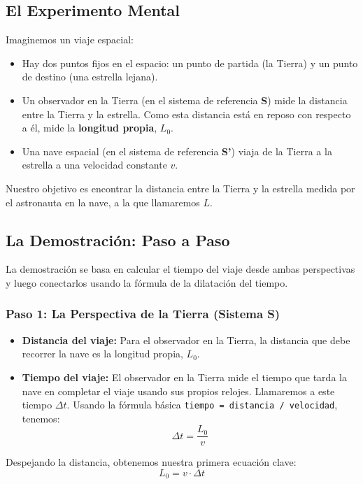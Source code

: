 \documentclass[11pt,a4paper]{book}
\begin{document}
\subsection*{El Experimento Mental}
Imaginemos un viaje espacial:
\begin{itemize}
    \item Hay dos puntos fijos en el espacio: un punto de partida (la Tierra) y un punto de destino (una estrella lejana).
    \item Un observador en la Tierra (en el sistema de referencia \textbf{S}) mide la distancia entre la Tierra y la estrella. Como esta distancia está en reposo con respecto a él, mide la \textbf{longitud propia}, $L_0$.
    \item Una nave espacial (en el sistema de referencia \textbf{S'}) viaja de la Tierra a la estrella a una velocidad constante $v$.
\end{itemize}
Nuestro objetivo es encontrar la distancia entre la Tierra y la estrella medida por el astronauta en la nave, a la que llamaremos $L$.

\subsection*{La Demostración: Paso a Paso}
La demostración se basa en calcular el tiempo del viaje desde ambas perspectivas y luego conectarlos usando la fórmula de la dilatación del tiempo.

\subsubsection*{Paso 1: La Perspectiva de la Tierra (Sistema S)}
\begin{itemize}
    \item \textbf{Distancia del viaje:} Para el observador en la Tierra, la distancia que debe recorrer la nave es la longitud propia, $L_0$.
    \item \textbf{Tiempo del viaje:} El observador en la Tierra mide el tiempo que tarda la nave en completar el viaje usando sus propios relojes. Llamaremos a este tiempo $\Delta t$. Usando la fórmula básica \texttt{tiempo = distancia / velocidad}, tenemos:
    \[ \Delta t = \frac{L_0}{v} \]
\end{itemize}
Despejando la distancia, obtenemos nuestra primera ecuación clave:
\begin{equation} \label{eq:dist_tierra}
    L_0 = v \cdot \Delta t
\end{equation}
\end{document}
